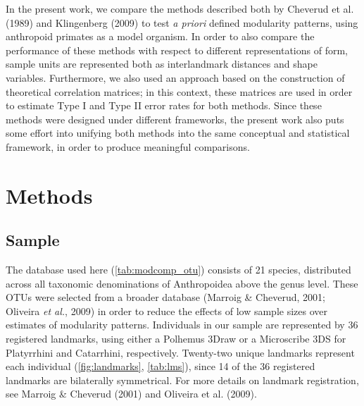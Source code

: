 \documentclass[11pt,twoside]{report}
\begin{document}
In the present work, we compare the methods described both by Cheverud
et al. (1989) and Klingenberg (2009) to test \emph{a priori} defined
modularity patterns, using anthropoid primates as a model organism. In
order to also compare the performance of these methods with respect to
different representations of form, sample units are represented both as
interlandmark distances and shape variables. Furthermore, we also used
an approach based on the construction of theoretical correlation
matrices; in this context, these matrices are used in order to estimate
Type I and Type II error rates for both methods. Since these methods
were designed under different frameworks, the present work also puts
some effort into unifying both methods into the same conceptual and
statistical framework, in order to produce meaningful comparisons.

\section{Methods}\label{methods}

\subsection{Sample}\label{sample}

The database used here (\autoref{tab:modcomp_otu}) consists of 21
species, distributed across all taxonomic denominations of Anthropoidea
above the genus level. These OTUs were selected from a broader database
(Marroig \& Cheverud, 2001; Oliveira \emph{et al.}, 2009) in order to
reduce the effects of low sample sizes over estimates of modularity
patterns. Individuals in our sample are represented by 36 registered
landmarks, using either a Polhemus 3Draw or a Microscribe 3DS for
Platyrrhini and Catarrhini, respectively. Twenty-two unique landmarks
represent each individual (\autoref{fig:landmarks}, \autoref{tab:lms}),
since 14 of the 36 registered landmarks are bilaterally symmetrical. For
more details on landmark registration, see Marroig \& Cheverud (2001)
and Oliveira et al. (2009).


\end{document}
